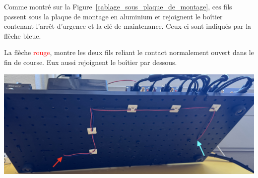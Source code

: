 \begin{minipage}[c]{0.48\textwidth}
    Comme montré sur la Figure~\ref{cablage_sous_plaque_de_montage}, ces fils passent sous la plaque de montage en aluminium et rejoignent le boîtier contenant l'arrêt d'urgence et la clé de maintenance. Ceux-ci sont indiqués par la flèche \textcolor[RGB]{115, 210, 210}{bleue}.

    \vspace{1em}
    La flèche \textcolor{red}{rouge}, montre les deux fils reliant le contact normalement ouvert dans le fin de course. Eux aussi rejoignent le boîtier par dessous.
\end{minipage}\hfill
\begin{minipage}[c]{0.48\textwidth}
    \begin{center}
        \includegraphics[width=\textwidth]{assets/figures/Protections_laser/Securite_electrique/cablage_sous_plaque_de_montage.jpeg}
    \end{center}
    \label{cablage_sous_plaque_de_montage}
\end{minipage}

